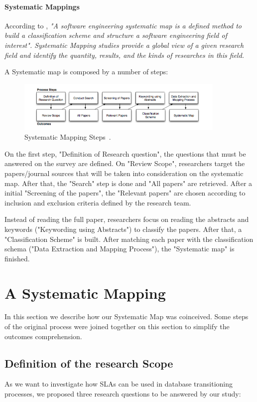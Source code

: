 \documentclass{article}
\begin{document}
\paragraph*{Systematic Mappings}
According to \cite{Petersen:2008:SMS:2227115.2227123}, \textit{"A software engineering systematic map is a defined method to build a classification scheme and structure a software engineering field of interest". 
Systematic Mapping studies provide a global view of a given research field and identify the quantity, results, and the kinds of researches in this field.}

A Systematic map is composed by a number of steps:
\begin{figure}[ht!]
\centering
\includegraphics[width=100mm]{pic1.png}
\caption{Systematic Mapping Steps~\cite{Petersen:2008:SMS:2227115.2227123}.\label{fig:sms}}
\end{figure}

On the first step, "Definition of Research question", the questions that must be answered on the survey are defined. On "Review Scope", researchers target the papers/journal sources that will be taken into consideration on the systematic map. After that, the "Search" step is done and "All papers" are retrieved. After a initial "Screening of the papers", the "Relevant papers" are chosen according to inclusion and exclusion criteria defined by the research team. 

Instead of reading the full paper, researchers focus on reading the abstracts and keywords ("Keywording using Abstracts") to classify the papers. After that, a "Classification Scheme" is built. After matching each paper with the classification schema ("Data Extraction and Mapping Process"), the  "Systematic map" is finished. 


\section{A Systematic Mapping}
\label{sec:asm}

In this section we describe how our Systematic Map was coinceived. Some steps of the original process were joined together on this section to simplify the outcomes comprehension.  

\subsection{Definition of the research Scope}
As we want to investigate how SLAs can be used in database transitioning processes, we proposed three research questions to be answered by our study: 
\end{document}
